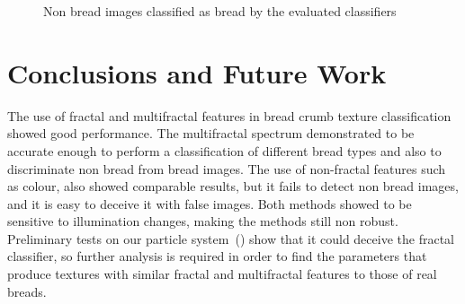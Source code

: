 \documentclass[oneside,a4paper,english,links]{amca}
\newcommand{\todo}[1]{\textbf{[TODO: #1]}}
\begin{document}
\begin{figure}
\begin{centering}
\par\end{centering}
\caption{Non bread images classified as bread by the evaluated classifiers}
\end{figure}


\section{Conclusions and Future Work}
The use of fractal and multifractal features in bread crumb texture classification showed good performance. The multifractal spectrum demonstrated to be accurate enough to perform a classification of different bread types and also to discriminate non bread from bread images. The use of non-fractal features such as colour, also showed comparable results, but it fails to detect non bread images, and it is easy to deceive it with false images. Both methods showed to be sensitive to illumination changes, making the methods still non robust. Preliminary tests on our particle system~(\cite{Baravalle2011}) show that it could deceive the fractal classifier, so further analysis is required in order to find the parameters that produce textures with similar fractal and multifractal features to those of real breads.
\end{document}
